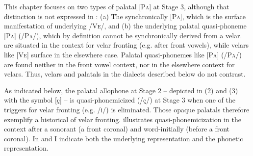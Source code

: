 This chapter focuses on two types of palatal [\textsc{Pa}] at Stage 3, although that distinction is not expressed in : (a) The synchronically  [\textsc{Pa}], which is the surface manifestation of underlying /\textsc{Ve}/, and (b) the underlying palatal quasi-phoneme [\textsc{Pa}] (/\textsc{Pa}/), which by definition cannot be synchronically derived from a velar.  are situated in the context for velar fronting (e.g. after front vowels), while velars like [\textsc{Ve}] surface in the elsewhere case. Palatal quasi-phonemes like [\textsc{Pa}] (/\textsc{Pa}/) are found neither in the front vowel context, nor in the elsewhere context for velars. Thus, velars and palatals in the dialects described below do not contrast.

As indicated below, the palatal allophone at Stage 2 -- depicted in (2) and (3) with the symbol [ç] -- is quasi-phonemicized (/ç/) at Stage 3 when one of the triggers for velar fronting (e.g. /i/) is eliminated. Those opaque palatals therefore exemplify a historical  of velar fronting.  illustrates quasi-phonemicization in the context after a sonorant (a front coronal) and  word-initially (before a front coronal). In  and  I indicate both the underlying representation and the phonetic representation.


